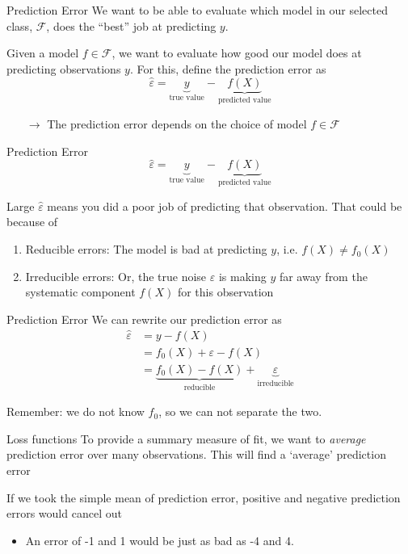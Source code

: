 \documentclass[aspectratio=169,t,11pt,table]{beamer}
\begin{document}
\begin{frame}{Prediction Error}
  We want to be able to evaluate which model in our selected class, $\mathcal{F}$, does the ``best'' job at predicting $y$. 
  
  \bigskip
  Given a model $f \in \mathcal{F}$, we want to evaluate how good our model does at predicting observations $y$. For this, define the \alert{prediction error} as 
  $$
    \hat{\varepsilon} = \underbrace{y}_{\text{true value}} - \underbrace{f(X)}_{\text{predicted value}}
  $$

  \begin{itemize}
    \item[$\rightarrow$] The prediction error depends on the choice of model $f \in \mathcal{F}$
  \end{itemize}
\end{frame}

\begin{frame}{Prediction Error}
  $$
    \hat{\varepsilon} = \underbrace{y}_{\text{true value}} - \underbrace{f(X)}_{\text{predicted value}}
  $$

  \bigskip
  Large $\hat{\varepsilon}$ means you did a poor job of predicting that observation. That could be because of
  \begin{enumerate}
    \item \alert{Reducible errors}: The model is bad at predicting $y$, i.e. $f(X) \neq f_0(X)$
    
    \item \alert{Irreducible errors}: Or, the true noise $\varepsilon$ is making $y$ far away from the systematic component $f(X)$ for this observation
  \end{enumerate}
\end{frame}

\begin{frame}{Prediction Error}
  We can rewrite our prediction error as
  \begin{align*}
    \hat{\varepsilon} &= y - f(X) \\
    &= f_0(X) + \varepsilon - f(X) \\
    &= \underbrace{f_0(X) - f(X)}_{\text{reducible}} + \underbrace{\varepsilon}_{\text{irreducible}}
  \end{align*}

  \bigskip
  {\color{blue} Remember:} we do not know $f_0$, so we can not separate the two.
\end{frame}

\begin{frame}{Loss functions}
  To provide a summary measure of fit, we want to \emph{average} prediction error over many observations. This will find a `average' prediction error

  \bigskip
  If we took the simple mean of prediction error, positive and negative prediction errors would cancel out
  \begin{itemize}
    \item An error of -1 and 1 would be just as bad as -4 and 4.
  \end{itemize}
\end{frame}
\end{document}
